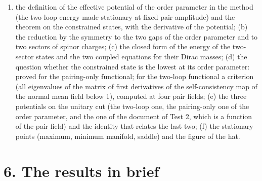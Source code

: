 \documentclass[
  10pt,
]{article}
\providecommand{\tightlist}{%
  \setlength{\itemsep}{0pt}\setlength{\parskip}{0pt}}
\begin{document}
\begin{enumerate}
\def\labelenumi{(\alph{enumi})}
\tightlist
\item
  the definition of the effective potential of the order parameter in
  the method (the two-loop energy made stationary at fixed pair
  amplitude) and the theorem on the constrained states, with the
  derivative of the potential; (b) the reduction by the symmetry to the
  two gaps of the order parameter and to two sectors of spinor charges;
  (c) the closed form of the energy of the two-sector states and the two
  coupled equations for their Dirac masses; (d) the question whether the
  constrained state is the lowest at its order parameter: proved for the
  pairing-only functional; for the two-loop functional a criterion (all
  eigenvalues of the matrix of first derivatives of the self-consistency
  map of the normal mean field below 1), computed at four pair fields;
  (e) the three potentials on the unitary cut (the two-loop one, the
  pairing-only one of the order parameter, and the one of the document
  of Test 2, which is a function of the pair field) and the identity
  that relates the last two; (f) the stationary points (maximum, minimum
  manifold, saddle) and the figure of the hat.
\end{enumerate}

\hypertarget{the-results-in-brief}{%
\section{6. The results in brief}\label{the-results-in-brief}}
\end{document}
